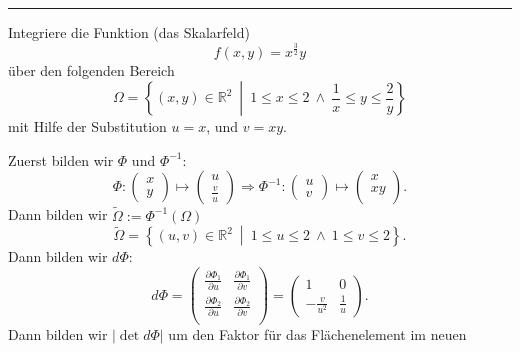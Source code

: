 \documentclass[a4paper,landscape,8pt]{extarticle}
\newcommand{\R}{\mathbb{R}}
\newcommand{\abs}[1]{\left\lvert #1 \right\rvert}
\newcommand{\sep}{\vspace{5pt}\noindent\hrule\vspace{5pt}}
\begin{document}
\begin{multicols*}{4}
\sep

\Bsp Integriere die Funktion (das Skalarfeld)
\[
f(x,y) = x^{\frac{3}{2}}y
\]
über den folgenden Bereich
\[
\Omega = \left\{(x,y)\in\R^2 \ \middle| \ 1\leq x \leq 2 \ \land \
\frac{1}{x}\leq y
\leq
\frac{2}{y}\right\}
\]
mit Hilfe der Substitution $u=x$, und $v= xy$.

Zuerst bilden wir $\Phi$ und $\Phi^{-1}$:
\[
\Phi \colon
\begin{pmatrix}
x\\
y
\end{pmatrix}
\mapsto
\begin{pmatrix}
u\\
\frac{v}{u}
\end{pmatrix}
\Longrightarrow
\Phi^{-1}\colon
\begin{pmatrix}
u\\
v
\end{pmatrix}
\mapsto
\begin{pmatrix}
x\\
xy\\
\end{pmatrix}.
\]
Dann bilden wir $\widetilde{\Omega}:=\Phi^{-1}(\Omega)$
\[
\widetilde{\Omega}= \left\{(u,v)\in\R^2 \ \middle| \ 1\leq u \leq 2 \ \land \
1\leq v \leq 2\right\}.
\]
Dann bilden wir $d\Phi$:
\[
d\Phi = \begin{pmatrix}
\frac{\partial \Phi_1}{\partial u} & \frac{\partial \Phi_1}{\partial v}\\
\frac{\partial \Phi_2}{\partial u} & \frac{\partial \Phi_2}{\partial v}\\
\end{pmatrix}
=
\begin{pmatrix}
1 & 0 \\
-\frac{v}{u^2} & \frac{1}{u}
\end{pmatrix}.
\]
Dann bilden wir $\abs{\det d\Phi}$ um den Faktor für das Flächenelement im neuen

\end{multicols*}
\end{document}
